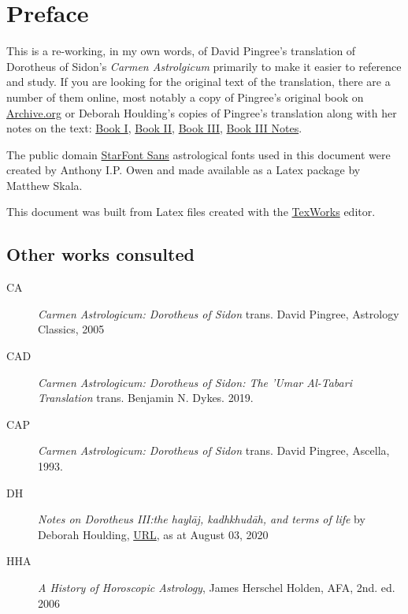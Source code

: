 \chapter{Preface}
This is a re-working, in my own words, of David Pingree's translation of Dorotheus of Sidon's \textsl{Carmen Astrolgicum} primarily to make it easier to reference and study. If you are looking for the original text of the translation, there are a number of them online, most notably a copy of Pingree's original book on \href{https://archive.org/details/PingreeDS1976}{Archive.org} or Deborah Houlding's copies of Pingree's translation along with her notes on the text: \href{https://www.skyscript.co.uk/dorotheus1.pdf}{Book I}, \href{https://www.skyscript.co.uk/dorotheus2.pdf}{Book II}, \href{https://www.skyscript.co.uk/dorotheus3.pdf}{Book III}, \href{https://www.skyscript.co.uk/dorotheus3notes.pdf}{Book III Notes}.

The public domain \href{https://www.ctan.org/pkg/starfont}{StarFont Sans} astrological fonts used in this document were created by Anthony I.P. Owen and made available as a Latex package by Matthew Skala. 

This document was built from Latex files created with the \href{https://www.tug.org/texworks/}{TexWorks} editor.

\section{Other works consulted}
\begin{description}
\item[CA]
	\textsl{Carmen Astrologicum: Dorotheus of Sidon} trans. David Pingree, Astrology Classics, 2005

\item[CAD]
	\textsl{Carmen Astrologicum: Dorotheus of Sidon: The 'Umar Al-Tabari Translation} trans. Benjamin N. Dykes. 2019.

\item[CAP]
	\textsl{Carmen Astrologicum: Dorotheus of Sidon} trans. David Pingree, Ascella, 1993.
	
\item[DH]
	\textsl{Notes on Dorotheus III:the haylāj, kadhkhudāh, and terms of life} by Deborah Houlding, \href{https://www.skyscript.co.uk/dorotheus3notes.pdf}{URL}, as at August 03, 2020
	
\item[HHA]
	\textsl{A History of Horoscopic Astrology}, James Herschel Holden, AFA, 2nd. ed. 2006
\end{description}

